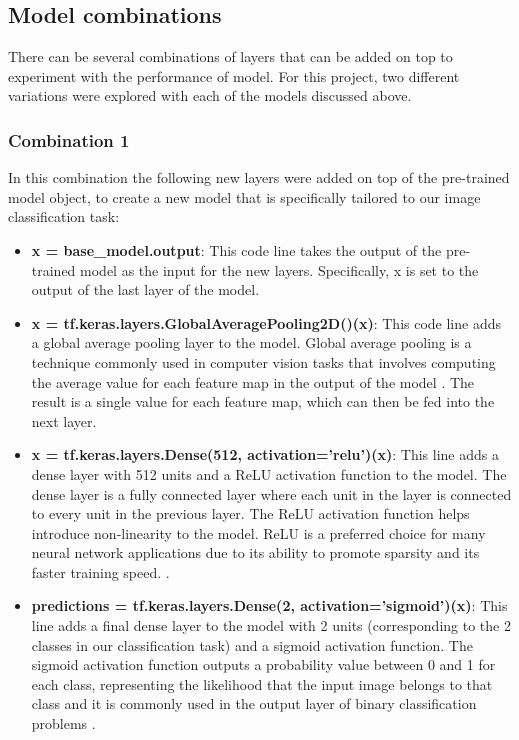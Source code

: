 \subsection{Model combinations}
\label{model_combinations}

There can be several combinations of layers that can be added on top to experiment with the performance of model. For this project, two different variations were explored with each of the models discussed above. 


\subsubsection{Combination 1}
\label{subsubsec:variation_1}

In this combination the following new layers were added on top of the pre-trained model object, to create a new model that is specifically tailored to our image classification task:

\begin{itemize}
    \item \textbf{x = base\_model.output}: This code line takes the output of the pre-trained model as the input for the new layers. Specifically, x is set to the output of the last layer of the model.
    \item \textbf{x = tf.keras.layers.GlobalAveragePooling2D()(x)}: This code line adds a global average pooling layer to the model. Global average pooling is a technique commonly used in computer vision tasks that involves computing the average value for each feature map in the output of the model \cite{lin2013network}. The result is a single value for each feature map, which can then be fed into the next layer.
    \item \textbf{x = tf.keras.layers.Dense(512, activation='relu')(x)}: This line adds a dense layer with 512 units and a ReLU activation function to the model. The dense layer is a fully connected layer where each unit in the layer is connected to every unit in the previous layer. The ReLU activation function helps introduce non-linearity to the model. ReLU is a preferred choice for many neural network applications due to its ability to promote sparsity and its faster training speed. \cite{parhi2020role}.
    \item \textbf{predictions = tf.keras.layers.Dense(2, activation='sigmoid')(x)}: This line adds a final dense layer to the model with 2 units (corresponding to the 2 classes in our classification task) and a sigmoid activation function. The sigmoid activation function outputs a probability value between 0 and 1 for each class, representing the likelihood that the input image belongs to that class and it is commonly used in the output layer of binary classification problems \cite{sharma2017activation}.
\end{itemize}

